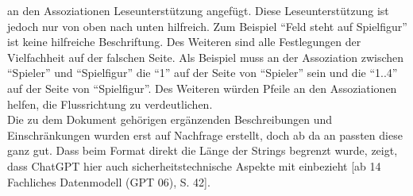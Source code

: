 an den Assoziationen Leseunterstützung angefügt. Diese Leseunterstützung ist jedoch nur von oben nach unten hilfreich. Zum Beispiel 
``Feld steht auf Spielfigur'' ist keine hilfreiche Beschriftung. Des Weiteren sind alle Festlegungen der Vielfachheit auf der falschen 
Seite. Als Beispiel muss an der Assoziation zwischen ``Spieler'' und ``Spielfigur'' die ``1'' auf der Seite von ``Spieler'' sein und die 
``1..4'' auf der Seite von ``Spielfigur''. Des Weiteren würden Pfeile an den Assoziationen helfen, die Flussrichtung zu verdeutlichen.\\
Die zu dem Dokument gehörigen ergänzenden Beschreibungen und Einschränkungen wurden erst auf Nachfrage erstellt, doch ab da an 
passten diese ganz gut. Dass beim Format direkt die Länge der Strings begrenzt wurde, zeigt, dass ChatGPT hier auch sicherheitstechnische 
Aspekte mit einbezieht [ab 14 Fachliches Datenmodell (GPT 06), S. 42].

